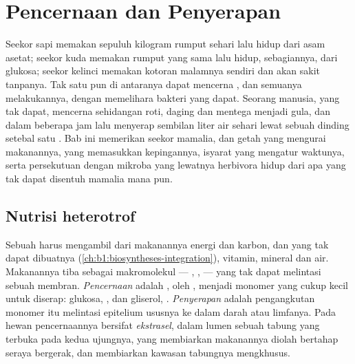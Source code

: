 \chapter{Pencernaan dan Penyerapan}\label{ch:b1:digestion-absorption}

Seekor sapi memakan sepuluh kilogram rumput sehari lalu hidup dari
asam asetat; seekor kuda memakan rumput yang sama lalu hidup,
sebagiannya, dari glukosa; seekor kelinci memakan kotoran malamnya
sendiri dan akan sakit tanpanya. Tak satu pun di antaranya dapat
mencerna , dan semuanya melakukannya, dengan memelihara
bakteri yang dapat. Seorang manusia, yang tak dapat, mencerna
sehidangan roti, daging dan mentega menjadi gula,  dan  dalam beberapa jam lalu menyerap sembilan liter air sehari lewat
sebuah dinding setebal satu . Bab ini memerikan 
seekor mamalia,  dan getah yang mengurai makanannya,  yang
memasukkan kepingannya, isyarat yang mengatur waktunya, serta
persekutuan dengan mikroba yang lewatnya herbivora hidup dari apa yang
tak dapat disentuh  mamalia mana pun.

\section{Nutrisi heterotrof}

\begin{definition}\label{def:b1:digestion-absorption:nutrition}
Sebuah  harus mengambil dari makanannya energi dan karbon,
 dan  yang tak dapat dibuatnya
(\cref{ch:b1:biosyntheses-integration}), vitamin, mineral dan air.
Makanannya tiba sebagai makromolekul --- , ,  --- yang
tak dapat melintasi sebuah membran. \emph{Pencernaan} adalah
, oleh , menjadi monomer yang cukup kecil untuk
diserap: glukosa, ,  dan gliserol, .
\emph{Penyerapan} adalah pengangkutan monomer itu melintasi epitelium
ususnya ke dalam darah atau limfanya. Pada hewan pencernaannya bersifat
\emph{ekstrasel}, dalam lumen sebuah tabung yang terbuka pada kedua
ujungnya, yang membiarkan makanannya diolah bertahap seraya bergerak,
dan membiarkan kawasan tabungnya mengkhusus.
\end{definition}

